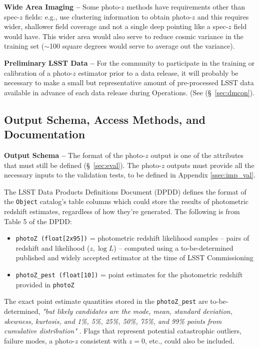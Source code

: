 \documentclass[DM,authoryear,toc]{lsstdoc}
\begin{document}
\begin{enumerate}
{\bf Wide Area Imaging --} 
Some photo-$z$ methods have requirements other than spec-$z$ fields: e.g., \citet{2019MNRAS.483.2801S} use clustering information to obtain photo-$z$ and this requires wider, shallower field coverage and not a single deep pointing like a spec-$z$ field would have. 
This wider area would also serve to reduce cosmic variance in the training set ($\sim$100 square degrees would serve to average out the variance).

{\bf Preliminary LSST Data --}
For the community to participate in the training or calibration of a photo-$z$ estimator prior to a data release, it will probably be necessary to make a small but representative amount of pre-processed LSST data available in advance of each data release during Operations. (See (\S~\ref{sec:dmcon}).

\subsection{Output Schema, Access Methods, and Documentation}\label{ssec:dp_pz}

{\bf Output Schema --} 
The format of the photo-$z$ output is one of the attributes that must still be defined (\S~\ref{sec:eval}). 
The photo-$z$ outputs must provide all the necessary inputs to the validation tests, to be defined in Appendix \ref{ssec:imp_val}.

The LSST Data Products Definitions Document (DPDD)  defines the format of the {\tt Object} catalog's table columns which could store the results of photometric redshift estimates, regardless of how they're generated. 
The following is from Table 5 of the DPDD:
\vspace{-15pt}
\begin{itemize}
\item \texttt{photoZ (float[2x95])} = photometric redshift likelihood samples -- pairs of redshift and likelihood ($z,\log{L}$) -- computed using a to-be-determined published and widely accepted estimator at the time of LSST Commissioning
\item \texttt{photoZ\_pest (float[10])} = point estimates for the photometric redshift provided in {\tt photoZ}
\end{itemize}

The exact point estimate quantities stored in the \texttt{photoZ\_pest} are to-be-determined, {\it "but likely candidates are the mode, mean, standard deviation, skewness, kurtosis, and 1\%, 5\%, 25\%, 50\%, 75\%, and 99\% points from cumulative distribution"} . 
Flags that represent potential catastrophic outliers, failure modes, a photo-$z$ consistent with $z=0$, etc., could also be included.


\end{enumerate}
\end{document}
